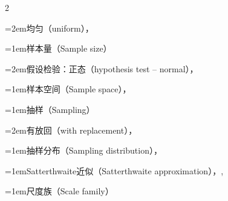\begin{multicols}{2}
\par\noindent\hangindent=2em\hspace*{1em}\label{idx:945}均匀（uniform），\hyperref[ex:5.4.7]{\pageref*{ex:5.4.7}}\par
\par\addvspace{2pt}
\par\noindent\hangindent=1em\hspace*{0em}\label{idx:946}样本量（Sample size）\par
\par\noindent\hangindent=2em\hspace*{1em}\label{idx:947}假设检验：正态（hypothesis test – normal），\hyperref[ex:8.3.4]{\pageref*{ex:8.3.4}}\par
\par\addvspace{2pt}
\par\noindent\hangindent=1em\hspace*{0em}\label{idx:948}样本空间（Sample space），\hyperref[def:1.1.1]{\pageref*{def:1.1.1}}\par
\par\addvspace{2pt}
\par\noindent\hangindent=1em\hspace*{0em}\label{idx:949}抽样（Sampling）\par
\par\noindent\hangindent=2em\hspace*{1em}\label{idx:950}有放回（with replacement），\hyperref[ex:10.1.19]{\pageref*{ex:10.1.19}}\par
\par\addvspace{2pt}
\par\noindent\hangindent=1em\hspace*{0em}\label{idx:951}抽样分布（Sampling distribution），\hyperref[def:5.2.1]{\pageref*{def:5.2.1}}\par
\par\addvspace{2pt}
\par\noindent\hangindent=1em\hspace*{0em}\label{idx:952}Satterthwaite近似（Satterthwaite approximation），\hyperref[ex:7.2.3]{\pageref*{ex:7.2.3}}, \hyperref[exercise:8.42]{\pageref*{exercise:8.42}}\par
\par\addvspace{2pt}
\par\noindent\hangindent=1em\hspace*{0em}\label{idx:953}尺度族（Scale family）\par

\end{multicols}
